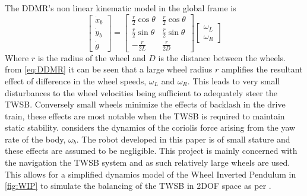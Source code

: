     The  DDMR's non linear kinematic model in the global frame is 
    \begin{equation}
        \begin{bmatrix}
            \dot{x}_b \\
            \dot{y}_b \\
            \dot{\theta}
        \end{bmatrix}
        =
        \begin{bmatrix}
            \frac{r}{2} \cos \theta & \frac{r}{2} \cos \theta \\
            \frac{r}{2} \sin \theta & \frac{r}{2} \sin \theta \\
            -\frac{r}{2L} & \frac{r}{2D}
        \end{bmatrix}
        \begin{bmatrix}
            \omega_L \\
            \omega_R
        \end{bmatrix}
        \label{eq:DDMR}
    \end{equation}
    Where $r$ is the radius of the wheel and $D$ is the distance between the wheels.
    from \ref{eq:DDMR} it can be seen that a large wheel radius $r$ amplifies the resultant effect of difference in the wheel 
    speeds, $\omega_L$ and $\omega_R$. This leads to very small disturbances to the wheel velocities being sufficient 
    to adequately steer the TWSB. Conversely small wheels minimize the effects of backlash in the drive train, these effects are most notable 
    when the TWSB is required to maintain static stability. \cite{kim2015dynamic} considers the dynamics of the coriolis force 
    arising from the yaw rate of the body, $\omega_b$. The robot developed in this paper is of small stature and these effects 
    are assumed to be negligible. This project is mainly concerned with the navigation the TWSB system and as such 
    relatively large wheels are used. This allows for a simplified dynamics model of the Wheel Inverted Pendulum 
    in \ref{fig:WIP} to simulate the balancing of the TWSB in 2DOF space as per \cite{SelfContainedMobileTWSB}.

